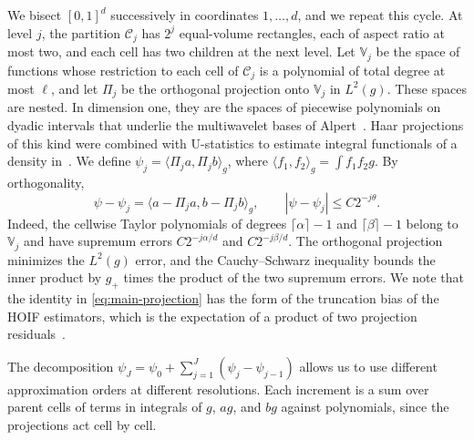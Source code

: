 We bisect $[0,1]^d$ successively in coordinates $1,\ldots,d$, and we
repeat this cycle. At level $j$, the partition $\mathcal C_j$ has $2^j$
equal-volume rectangles, each of aspect ratio at most two, and each cell
has two children at the next level. Let $\mathbb V_j$ be the space of
functions whose restriction to each cell of $\mathcal C_j$ is a polynomial
of total degree at most $\ell$, and let $\Pi_j$ be the orthogonal
projection onto $\mathbb V_j$ in $L^2(g)$. These spaces are nested. In
dimension one, they are the spaces of piecewise polynomials on dyadic
intervals that underlie the multiwavelet bases of
Alpert~\cite[Section~1.1]{alpert1993}. Haar projections of this kind
were combined with U-statistics to estimate integral functionals of a
density in~\cite{kerkyacharianpicard1996}.
We
define $\psi_j=\langle\Pi_j a,\Pi_j b\rangle_g$, where
$\langle f_1,f_2\rangle_g=\int f_1f_2g$. By orthogonality,
\begin{equation}\label{eq:main-projection}
 \psi-\psi_j=\langle a-\Pi_j a,b-\Pi_j b\rangle_g,
 \qquad |\psi-\psi_j|\le C2^{-j\theta}.
\end{equation}
Indeed, the cellwise Taylor polynomials of degrees $\lceil\alpha\rceil-1$
and $\lceil\beta\rceil-1$ belong to $\mathbb V_j$ and have supremum errors
$C2^{-j\alpha/d}$ and $C2^{-j\beta/d}$. The orthogonal projection
minimizes the $L^2(g)$ error, and the Cauchy--Schwarz inequality bounds
the inner product by $g_+$ times the product of the two supremum errors.
We note that the identity in \eqref{eq:main-projection} has the form of
the truncation bias of the HOIF estimators, which is the expectation of
a product of two projection residuals~\cite[Theorems~3.7--3.8]{hoif2008}.

The decomposition $\psi_J=\psi_0+\sum_{j=1}^J(\psi_j-\psi_{j-1})$ allows us
to use different approximation orders at different resolutions. Each
increment is a sum over parent cells of terms in integrals of $g$, $ag$,
and $bg$ against polynomials, since the projections act cell by cell.


